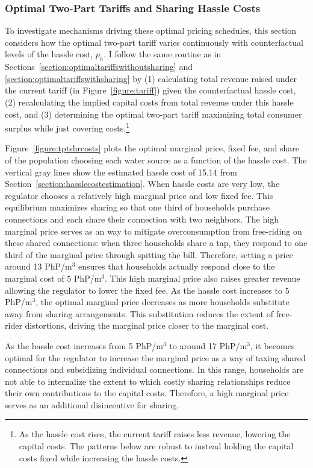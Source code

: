\documentclass[12pt]{article}
\begin{document}
\subsubsection{Optimal Two-Part Tariffs and Sharing Hassle Costs}

To investigate mechanisms driving these optimal pricing schedules, this section considers how the optimal two-part tariff varies continuously with counterfactual levels of the hassle cost, $p_h$.  I follow the same routine as in Sections~\ref{section:optimaltariffswithoutsharing} and \ref{section:optimaltariffswithsharing} by (1) calculating total revenue raised under the current tariff (in Figure~\ref{figure:tariff}) given the counterfactual hassle cost, (2) recalculating the implied capital costs from total revenue under this hassle cost, and (3) determining the optimal two-part tariff maximizing total consumer surplus while just covering costs.\footnote{As the hassle cost rises, the current tariff raises less revenue, lowering the capital costs.  The patterns below are robust to instead holding the capital costs fixed while increasing the hassle costs.}

Figure~\ref{figure:tptshrcosts} plots the optimal marginal price, fixed fee, and share of the population choosing each water source as a function of the hassle cost.  The vertical gray lines show the estimated hassle cost of 15.14 from Section~\ref{section:hasslecostestimation}.  When hassle costs are very low, the regulator chooses a relatively high marginal price and low fixed fee.  This equilibrium maximizes sharing so that one third of households purchase connections and each share their connection with two neighbors.  The high marginal price serves as an way to mitigate overconsumption from free-riding on these shared connections: when three households share a tap, they respond to one third of the marginal price through spitting the bill.  Therefore, setting a price around 13 PhP/$\text{m}^3$ ensures that households actually respond close to the marginal cost of 5 PhP/$\text{m}^3$.  This high marginal price also raises greater revenue allowing the regulator to lower the fixed fee.  As the hassle cost increases to 5 PhP/$\text{m}^3$, the optimal marginal price decreases as more households substitute away from sharing arrangements.  This substitution reduces the extent of free-rider distortions, driving the marginal price closer to the marginal cost.

As the hassle cost increases from 5 PhP/$\text{m}^3$ to around 17 PhP/$\text{m}^3$, it becomes optimal for the regulator to increase the marginal price as a way of taxing shared connections and subsidizing individual connections.  In this range, households are not able to internalize the extent to which costly sharing relationships reduce their own contributions to the capital costs.  Therefore, a high marginal price serves as an additional disincentive for sharing.
\end{document}
